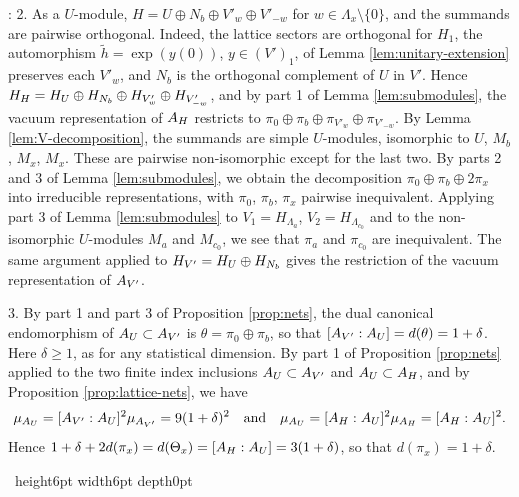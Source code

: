 \documentclass[leqno]{article}
\let\cal\relax
\newcommand{\cal}{\mathcal}
\renewcommand{\geq}{\ensuremath{\geqslant}}
\newcommand{\qed}{\hfill \vrule height6pt  width6pt depth0pt}
\newenvironment{proof}[1][]{\noindent {\it Proof #1} : }{\hbox{~}\qed
\smallskip
}
\numberwithin{equation}{section}
\begin{document}
\begin{proof}
2. As a $U$-module, $H = U \oplus N_b \oplus V'_w \oplus V'_{-w}$ for $w \in \Lambda_x \setminus \{0\}$, and the summands are pairwise orthogonal. Indeed, the lattice sectors are orthogonal for $H_1$, the automorphism $\tilde h = \exp(y(0))$, $y \in (V')_1$, of Lemma \ref{lem:unitary-extension} preserves each $V'_w$, and $N_b$ is the orthogonal complement of $U$ in $V'$. Hence $\cal H_H = \cal H_U \oplus \cal H_{N_b} \oplus \cal H_{V'_w} \oplus \cal H_{V'_{-w}}$, and by part 1 of Lemma \ref{lem:submodules}, the vacuum representation of $\cal A_H$ restricts to $\pi_0 \oplus \pi_b \oplus \pi_{V'_w} \oplus \pi_{V'_{-w}}$. By Lemma \ref{lem:V-decomposition}, the summands are simple $U$-modules, isomorphic to $U$, $M_b$, $M_x$, $M_x$. These are pairwise non-isomorphic except for the last two. By parts 2 and 3 of Lemma \ref{lem:submodules}, we obtain the decomposition $\pi_0 \oplus \pi_b \oplus 2\pi_x$ into irreducible representations, with $\pi_0$, $\pi_b$, $\pi_x$ pairwise inequivalent. Applying part 3 of Lemma \ref{lem:submodules} to $V_1 = H_{\Lambda_a}$, $V_2 = H_{\Lambda_{c_0}}$ and to the non-isomorphic $U$-modules $M_a$ and $M_{c_0}$, we see that $\pi_a$ and $\pi_{c_0}$ are inequivalent. The same argument applied to $\cal H_{V'} = \cal H_U \oplus \cal H_{N_b}$ gives the restriction of the vacuum representation of $\cal A_{V'}$.

3. By part 1 and part 3 of Proposition \ref{prop:nets}, the dual canonical endomorphism of $\cal A_U \subset \cal A_{V'}$ is $\theta = \pi_0 \oplus \pi_b$, so that $[\cal A_{V'}:\cal A_U] = d(\theta) = 1+\delta$. Here $\delta \geq 1$, as for any statistical dimension. By part 1 of Proposition \ref{prop:nets} applied to the two finite index inclusions $\cal A_U \subset \cal A_{V'}$ and $\cal A_U \subset \cal A_H$, and by Proposition \ref{prop:lattice-nets}, we have
\[
\mu_{\cal A_U} = [\cal A_{V'}:\cal A_U]^2\mu_{\cal A_{V'}} = 9(1+\delta)^2 \quad \text{and} \quad \mu_{\cal A_U} = [\cal A_H:\cal A_U]^2\mu_{\cal A_H} = [\cal A_H:\cal A_U]^2.
\]
Hence $1+\delta+2d(\pi_x) = d(\Theta_x) = [\cal A_H : \cal A_U] = 3(1+\delta)$, so that $d(\pi_x) = 1+\delta$.


\end{proof}
\end{document}
